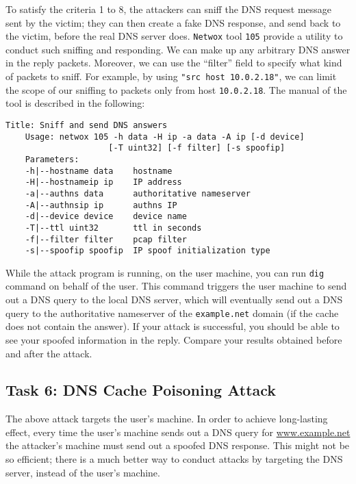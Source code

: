 To satisfy the criteria 1 to 8, the attackers can sniff the DNS request message
sent by the victim; they can then create a fake DNS response, and send back to the victim,
before the real DNS server does. {\tt Netwox} tool \texttt{105} provide a utility to conduct
such sniffing and responding.
We can make up any arbitrary DNS answer
in the reply packets. Moreover, we can use the ``filter'' field to specify what
kind of packets to sniff. For example, by using
\texttt{"src host 10.0.2.18"}, we can limit the scope of our
sniffing to packets only from host \texttt{10.0.2.18}.  The manual of the
tool is described in the following:

\begin{lstlisting}[caption={The usage of the Netwox Tool 105}]
Title: Sniff and send DNS answers
    Usage: netwox 105 -h data -H ip -a data -A ip [-d device]
                     [-T uint32] [-f filter] [-s spoofip]
    Parameters:
    -h|--hostname data    hostname
    -H|--hostnameip ip    IP address
    -a|--authns data      authoritative nameserver
    -A|--authnsip ip      authns IP
    -d|--device device    device name
    -T|--ttl uint32       ttl in seconds
    -f|--filter filter    pcap filter
    -s|--spoofip spoofip  IP spoof initialization type
\end{lstlisting}


While the attack program is running, on the user machine, you can
run \texttt{dig} command on behalf of the user.
This command triggers the user
machine to send out a DNS query to the local DNS server, which will
eventually send out a DNS query to the authoritative nameserver of the
\texttt{example.net} domain (if the cache does not contain the answer).
If your attack is successful, you should be able to see
your spoofed information in the reply. Compare your results obtained before
and after the attack. 




\subsection{Task 6: DNS Cache Poisoning Attack}

The above attack targets the user's machine. In order to achieve long-lasting
effect, every time the user's machine sends out a DNS query for
\url{www.example.net}
the attacker's machine must send out a spoofed DNS response. 
This might not be so efficient; there is a much better way to conduct attacks 
by targeting the DNS server, instead of the user's machine.


